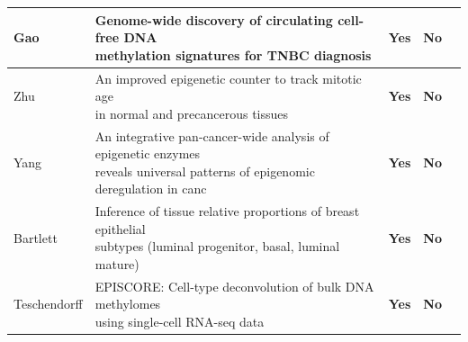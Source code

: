 \documentclass[10pt]{extarticle}
\newcommand{\yes}{\cellcolor{yesgreen}\textbf{Yes}}
\newcommand{\noo}{\cellcolor{nored}\textbf{No}}
\begin{document}
\begin{table}[H]
\begin{tabular}{|l|l|c|c|c|}
	Gao &
	\makecell[l]{Genome-wide discovery of circulating cell-free DNA\\ methylation signatures for TNBC diagnosis} &
	\yes & \noo & \cite{Gao2025} \\
	\hline

	Zhu &
	\makecell[l]{An improved epigenetic counter to track mitotic age\\ in normal and precancerous tissues} &
	\yes & \noo & \cite{Zhu2024} \\
	\hline

	Yang &
	\makecell[l]{An integrative pan-cancer-wide analysis of epigenetic enzymes\\ reveals universal patterns of epigenomic deregulation in canc} &
	\yes & \noo & \cite{Yang2015} \\
	\hline

	Bartlett &
	\makecell[l]{Inference of tissue relative proportions of breast epithelial\\ subtypes (luminal progenitor, basal, luminal mature)} &
	\yes & \noo & \cite{Bartlett2021} \\
	\hline

	Teschendorff &
	\makecell[l]{EPISCORE: Cell-type deconvolution of bulk DNA methylomes\\ using single-cell RNA-seq data} &
	\yes & \noo & \cite{Teschendorff2020} \\
	\hline

\end{tabular}
\end{table}
\end{document}
